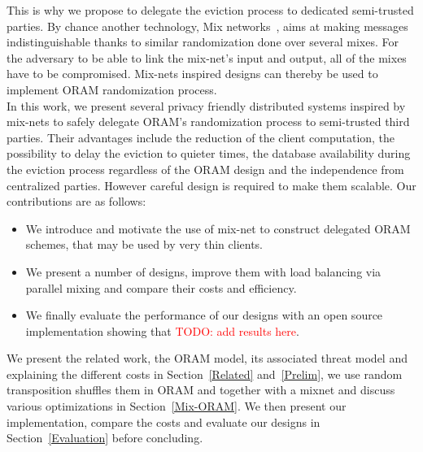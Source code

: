 \documentclass{llncs}
\newcommand{\todo}[1]{\textcolor{red}{TODO: #1}}
\begin{document}
This is why we propose to delegate the eviction process to dedicated semi-trusted parties. By chance another technology, Mix networks~\cite{chaum1981untraceable}, aims at making messages indistinguishable thanks to similar randomization done over several mixes. For the adversary to be able to link the mix-net's input and output, all of the mixes have to be compromised.
Mix-nets inspired designs can thereby be used to implement ORAM randomization process.\\

In this work, we present several privacy friendly distributed systems inspired by mix-nets to safely delegate ORAM's randomization process to semi-trusted third parties.
Their advantages include the reduction of the client computation, the possibility to delay the eviction to quieter times, the database availability during the eviction process regardless of the ORAM design and the independence from centralized parties. However careful design is required to make them scalable. Our contributions are as follows:
\begin{itemize}
 \item We introduce and motivate the use of mix-net to construct delegated ORAM schemes, that may be used by very thin clients.
 \item We present a number of designs, improve them with load balancing via parallel mixing and compare their costs and efficiency.
 \item We finally evaluate the performance of our designs with an open source implementation showing that \todo{add results here}.
\end{itemize}

We present the related work, the ORAM model, its associated threat model and explaining the different costs in Section~\ref{Related} and~\ref{Prelim}, we use random transposition shuffles them in ORAM and together with a mixnet and discuss various optimizations in Section~\ref{Mix-ORAM}. We then present our implementation, compare the costs and evaluate our designs in Section~\ref{Evaluation} before concluding.
\end{document}
